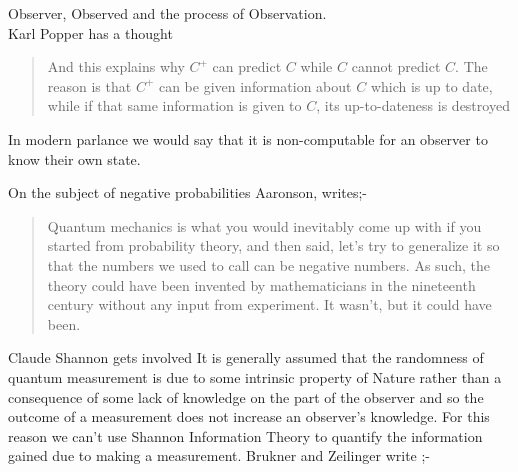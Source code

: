 \documentclass[final]{beamer}
\newlength{\colwidth}
\begin{document}
\begin{frame}[t]
\begin{columns}[t]
\begin{column}{\colwidth}
\begin{block}{Observer, Observed and the process of Observation.\\ Karl Popper has a thought}
    \begin{quote}
        And this explains why $C^+$ can predict $C$ while $C$ cannot predict $C$. The reason is that $C^+$ can be given information about $C$ which is up to date, while if that same information is given to $C$, its up-to-dateness is destroyed
    \end{quote}

    In modern parlance we would say that it is non-computable for an observer to know their own state.
    
    On the subject of negative probabilities Aaronson, \autocite{Aaronson:dem} writes;-
    
    \begin{quote}
      Quantum mechanics is what you would inevitably come up with if you started from probability theory, and then said, let's try to generalize it so that the numbers we used to call  can be negative numbers. As such, the theory could have been invented by mathematicians in the nineteenth century without any input from experiment. It wasn't, but it could have been.\\
    \end{quote}
  \end{block}
  \begin{block}{Claude Shannon gets involved}
  It is generally assumed that the randomness of quantum measurement is due to some intrinsic property of Nature rather than a consequence of some lack of knowledge on the part of the observer and so the outcome of a measurement does not increase an observer's knowledge. For this reason we can't use Shannon Information Theory to quantify the information gained due to making a measurement. Brukner and Zeilinger 
  \autocite{brukner_2000_shannon} write ;-
  

\end{block}
\end{column}
\end{columns}
\end{frame}
\end{document}
